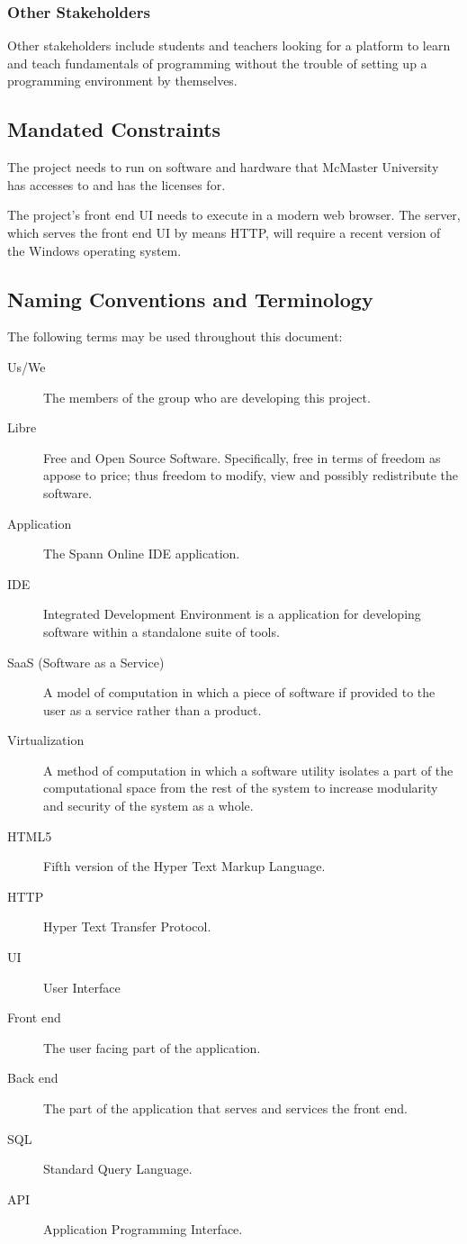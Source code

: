 \documentclass[12pt, titlepage]{article}
\begin{document}
    \subsubsection{Other Stakeholders}
		Other stakeholders include students and teachers looking for a platform to
		learn and teach fundamentals of programming without the trouble of setting
		up a programming environment by themselves.

  \subsection{Mandated Constraints}
  The project needs to run on software and hardware that McMaster University
  has accesses to and has the licenses for.

  The project's front end UI needs to execute in a modern web browser. The
  server, which serves the front end UI by means HTTP, will require a recent
  version of the Windows\textsuperscript{\textregistered} operating system.

  \subsection{Naming Conventions and Terminology}
	The following terms may be used throughout this document:

	\begin{description}
		\item [Us/We] The members of the group who are developing this project.
		\item [Libre] Free and Open Source Software. Specifically, free in terms of
			freedom as appose to price; thus freedom to modify, view and possibly
			redistribute the software.
		\item [Application] The Spann Online IDE application.
		\item [IDE] Integrated Development Environment is a application for
			developing software within a standalone suite of tools.
		\item [SaaS (Software as a Service)] A model of computation in which a piece
			of software if provided to the user as a service rather than a product.
		\item [Virtualization] A method of computation in which a software utility
			isolates a part of the computational space from the rest of the system to
			increase modularity and security of the system as a whole.
    \item [HTML5] Fifth version of the Hyper Text Markup Language.
    \item [HTTP] Hyper Text Transfer Protocol.
    \item [UI] User Interface
    \item [Front end] The user facing part of the application.
    \item [Back end] The part of the application that serves and services the
      front end.
    \item [SQL] Standard Query Language.
    \item [API] Application Programming Interface.
	\end{description}
\end{document}
